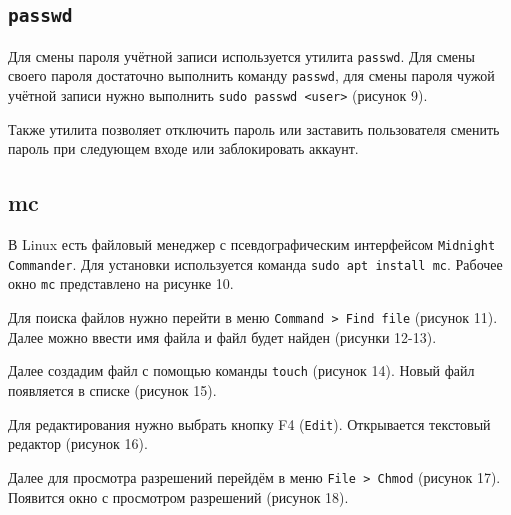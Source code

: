 \FloatBarrier

\subsection{\texttt{passwd}}

Для смены пароля учётной записи используется утилита \texttt{passwd}. Для смены своего пароля достаточно выполнить команду \texttt{passwd}, для смены пароля чужой учётной записи нужно выполнить \texttt{sudo passwd <user>} (рисунок 9).

\FloatBarrier

Также утилита позволяет отключить пароль или заставить пользователя сменить пароль при следующем входе или заблокировать аккаунт.


\subsection{mc}

В Linux есть файловый менеджер с псевдографическим интерфейсом \texttt{Midnight Commander}. Для установки используется команда \texttt{sudo apt install mc}.
Рабочее окно \texttt{mc} представлено на рисунке 10.

\FloatBarrier

Для поиска файлов нужно перейти в меню \texttt{Command > Find file} (рисунок 11). Далее можно ввести имя файла и файл будет найден (рисунки 12-13).

\FloatBarrier

Далее создадим файл с помощью команды \texttt{touch} (рисунок 14). Новый файл появляется в списке (рисунок 15).

\FloatBarrier

Для редактирования нужно выбрать кнопку F4 (\texttt{Edit}). Открывается текстовый редактор (рисунок 16).

\FloatBarrier

Далее для просмотра разрешений перейдём в меню \texttt{File > Chmod} (рисунок 17). Появится окно с просмотром разрешений (рисунок 18).

\FloatBarrier
\clearpage


